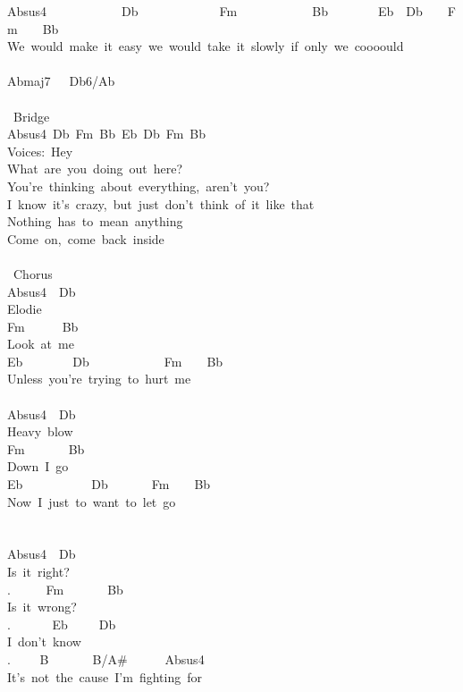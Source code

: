 {Absus4\ \ \ \ \ \ \ \ \ \ \ \ Db\ \ \ \ \ \ \ \ \ \ \ \ \ Fm\ \ \ \ \ \ \ \ \ \ \ \ Bb\ \ \ \ \ \ \ \ Eb\ \ Db\ \ \ \ Fm\ \ \ \ Bb\\
We\ would\ make\ it\ easy\ we\ would\ take\ it\ slowly\ if\ only\ we\ coooould\\
\\
Abmaj7\ \ \ Db6/Ab\\
\\
\lbrack\ Bridge\rbrack\\
Absus4\ Db\ Fm\ Bb\ Eb\ Db\ Fm\ Bb\ \\
Voices:\ Hey\\
What\ are\ you\ doing\ out\ here?\\
You're\ thinking\ about\ everything,\ aren't\ you?\\
I\ know\ it's\ crazy,\ but\ just\ don't\ think\ of\ it\ like\ that\\
Nothing\ has\ to\ mean\ anything\\
Come\ on,\ come\ back\ inside\\
\\
\lbrack\ Chorus\rbrack\\
Absus4\ \ Db\ \ \ \ \ \ \ \ \ \\
Elodie\\
Fm\ \ \ \ \ \ Bb\\
Look\ at\ me\\
Eb\ \ \ \ \ \ \ \ Db\ \ \ \ \ \ \ \ \ \ \ \ Fm\ \ \ \ Bb\\
Unless\ you're\ trying\ to\ hurt\ me\\
\\
Absus4\ \ Db\ \\
Heavy\ blow\\
Fm\ \ \ \ \ \ \ Bb\\
Down\ I\ go\\
Eb\ \ \ \ \ \ \ \ \ \ \ Db\ \ \ \ \ \ \ Fm\ \ \ \ Bb\\
Now\ I\ just\ to\ want\ to\ let\ go\\
\\
\\
Absus4\ \ Db\\
Is\ it\ right?\\
. \ \ \ \ \ Fm\ \ \ \ \ \ \ Bb\\
Is\ it\ wrong?\\
. \ \ \ \ \ \ Eb\ \ \ \ \ Db\ \\
I\ don't\ know\\
. \ \ \ \ B\ \ \ \ \ \ \ B/A\#\ \ \ \ \ \ Absus4\ \ \\
It's\ not\ the\ cause\ I'm\ fighting\ for\\
}
